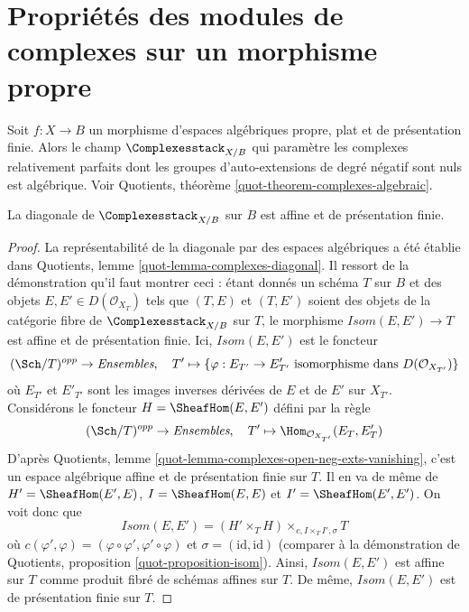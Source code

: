 \section{Propriétés des modules de complexes sur un morphisme propre}
\label{section-complexes}

\noindent
Soit $f : X \to B$ un morphisme d'espaces algébriques propre, plat et de
présentation finie. Alors le champ $\Complexesstack_{X/B}$ qui paramètre
les complexes relativement parfaits dont les groupes d'auto-extensions de
degré négatif sont nuls est algébrique. Voir Quotients, théorème
\ref{quot-theorem-complexes-algebraic}.

\begin{lemma}
\label{lemma-complexes-diagonal-affine-fp}
La diagonale de $\Complexesstack_{X/B}$ sur $B$ est affine et de
présentation finie.
\end{lemma}

\begin{proof}
La représentabilité de la diagonale par des espaces algébriques a été
établie dans Quotients, lemme \ref{quot-lemma-complexes-diagonal}.
Il ressort de la démonstration qu'il faut montrer ceci : étant donnés un
schéma $T$ sur $B$ et des objets $E, E' \in D(\mathcal{O}_{X_T})$ tels que
$(T, E)$ et $(T, E')$ soient des objets de la catégorie fibre de
$\Complexesstack_{X/B}$ sur $T$, le morphisme
$\mathit{Isom}(E, E') \to T$ est affine et de présentation finie.
Ici, $\mathit{Isom}(E, E')$ est le foncteur
$$
(\Sch/T)^{opp} \to \textit{Ensembles},\quad
T' \mapsto \{\varphi : E_{T'} \to E'_{T'}
\text{ isomorphisme dans }D(\mathcal{O}_{X_{T'}})\}
$$
où $E_{T'}$ et $E'_{T'}$ sont les images inverses dérivées de $E$ et de
$E'$ sur $X_{T'}$. Considérons le foncteur
$H = \SheafHom(E, E')$ défini par la règle
$$
(\Sch/T)^{opp} \to \textit{Ensembles},\quad
T' \mapsto \Hom_{\mathcal{O}_{X_{T'}}}(E_T, E'_T)
$$
D'après Quotients, lemme
\ref{quot-lemma-complexes-open-neg-exts-vanishing}, c'est un espace
algébrique affine et de présentation finie sur $T$.
Il en va de même de $H' = \SheafHom(E', E)$,
$I = \SheafHom(E, E)$ et $I' = \SheafHom(E', E')$.
On voit donc que
$$
\mathit{Isom}(E, E') = (H' \times_T H) \times_{c, I \times_T I', \sigma} T
$$
où $c(\varphi', \varphi) =
(\varphi \circ \varphi', \varphi' \circ \varphi)$ et
$\sigma = (\text{id}, \text{id})$ (comparer à la démonstration de
Quotients, proposition \ref{quot-proposition-isom}).
Ainsi, $\mathit{Isom}(E, E')$ est affine sur $T$ comme produit fibré de
schémas affines sur $T$. De même, $\mathit{Isom}(E, E')$ est de
présentation finie sur $T$.
\end{proof}

